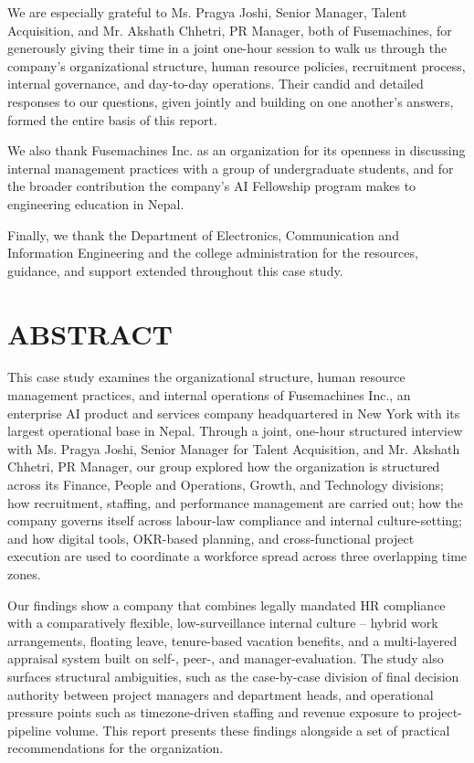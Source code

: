 \documentclass[12pt,a4paper]{report}
\begin{document}
We are especially grateful to Ms. Pragya Joshi, Senior Manager, Talent Acquisition, and Mr. Akshath Chhetri, PR Manager, both of Fusemachines, for generously giving their time in a joint one-hour session to walk us through the company's organizational structure, human resource policies, recruitment process, internal governance, and day-to-day operations. Their candid and detailed responses to our questions, given jointly and building on one another's answers, formed the entire basis of this report.

We also thank Fusemachines Inc. as an organization for its openness in discussing internal management practices with a group of undergraduate students, and for the broader contribution the company's AI Fellowship program makes to engineering education in Nepal.

Finally, we thank the Department of Electronics, Communication and Information Engineering and the college administration for the resources, guidance, and support extended throughout this case study.

\chapter*{ABSTRACT}

This case study examines the organizational structure, human resource management practices, and internal operations of Fusemachines Inc., an enterprise AI product and services company headquartered in New York with its largest operational base in Nepal. Through a joint, one-hour structured interview with Ms. Pragya Joshi, Senior Manager for Talent Acquisition, and Mr. Akshath Chhetri, PR Manager, our group explored how the organization is structured across its Finance, People and Operations, Growth, and Technology divisions; how recruitment, staffing, and performance management are carried out; how the company governs itself across labour-law compliance and internal culture-setting; and how digital tools, OKR-based planning, and cross-functional project execution are used to coordinate a workforce spread across three overlapping time zones.

Our findings show a company that combines legally mandated HR compliance with a comparatively flexible, low-surveillance internal culture -- hybrid work arrangements, floating leave, tenure-based vacation benefits, and a multi-layered appraisal system built on self-, peer-, and manager-evaluation. The study also surfaces structural ambiguities, such as the case-by-case division of final decision authority between project managers and department heads, and operational pressure points such as timezone-driven staffing and revenue exposure to project-pipeline volume. This report presents these findings alongside a set of practical recommendations for the organization.
\end{document}
